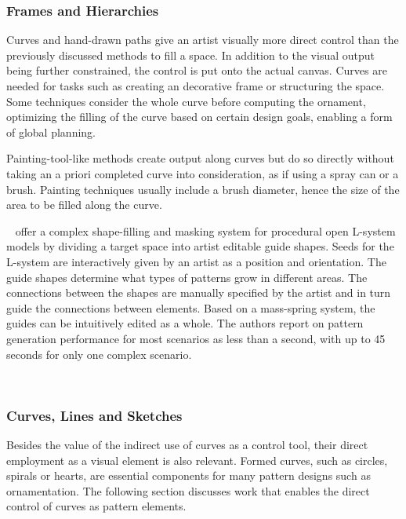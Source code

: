 \subsubsection{Frames and Hierarchies}
\label{subsubsec:analysis_frames_and_hierarchies}

Curves and hand-drawn paths give an artist visually more direct control than the previously discussed methods to fill a space. In addition to the visual output being further constrained, the control is put onto the actual canvas. Curves are needed for tasks such as creating an decorative frame or structuring the space. Some techniques consider the whole curve before computing the ornament, optimizing the filling of the curve based on certain design goals, enabling a form of global planning.

Painting-tool-like methods create output along curves but do so directly without taking an a priori completed curve into consideration, as if using a spray can or a brush. Painting techniques usually include a brush diameter, hence the size of the area to be filled along the curve.




\citeauthor*{benes_2011_gpm}~\cite{benes_2011_gpm} offer a complex shape-filling and masking system for procedural open L-system models by dividing a target space into artist editable guide shapes. Seeds for the L-system are interactively given by an artist as a position and orientation. The guide shapes determine what types of patterns grow in different areas. The connections between the shapes are manually specified by the artist and in turn guide the connections between elements. Based on a mass-spring system, the guides can be intuitively edited as a whole. The authors report on pattern generation performance for most scenarios as less than a second, with up to 45 seconds for only one complex scenario.


\citeauthor*{gieseke_2017_ooo}~\cite{gieseke_2017_ooo}




\subsubsection{Curves, Lines and Sketches}
\label{subsubsec:analysis_curves_lines_and_sketches}

Besides the value of the indirect use of curves as a control tool, their direct employment as a visual element is also relevant. Formed curves, such as circles, spirals or hearts, are essential components for many pattern designs such as ornamentation. The following section discusses work that enables the direct control of curves as pattern elements.

